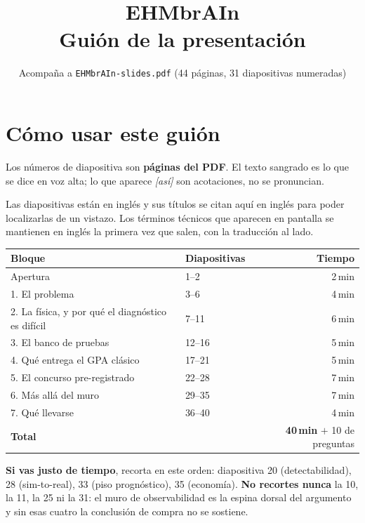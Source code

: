 \documentclass[11pt,a4paper]{article}
\title{\vspace{-1.5cm}\textbf{EHMbrAIn}\\[2mm]
  \large Guión de la presentación}
\author{}
\date{\small Acompaña a \texttt{EHMbrAIn-slides.pdf} (44 páginas, 31 diapositivas numeradas)}
\newcommand{\escena}[1]{{\itshape\color{grayc}[#1]}}
\begin{document}
\maketitle
\thispagestyle{fancy}
\vspace{-1.2cm}

\section*{Cómo usar este guión}

Los números de diapositiva son \textbf{páginas del PDF}. El texto sangrado es lo
que se dice en voz alta; lo que aparece \escena{así} son acotaciones, no se
pronuncian.

Las diapositivas están en inglés y sus títulos se citan aquí en inglés para poder
localizarlas de un vistazo. Los términos técnicos que aparecen en pantalla se
mantienen en inglés la primera vez que salen, con la traducción al lado.

\begin{center}\small
\begin{tabular}{@{}llr@{}}
  \toprule
  Bloque & Diapositivas & Tiempo \\
  \midrule
  Apertura & 1--2 & 2\,min \\
  1. El problema & 3--6 & 4\,min \\
  2. La física, y por qué el diagnóstico es difícil & 7--11 & 6\,min \\
  3. El banco de pruebas & 12--16 & 5\,min \\
  4. Qué entrega el GPA clásico & 17--21 & 5\,min \\
  5. El concurso pre-registrado & 22--28 & 7\,min \\
  6. Más allá del muro & 29--35 & 7\,min \\
  7. Qué llevarse & 36--40 & 4\,min \\
  \midrule
  \textbf{Total} & & \textbf{40\,min} $+$ 10 de preguntas \\
  \bottomrule
\end{tabular}
\end{center}

\textbf{Si vas justo de tiempo}, recorta en este orden: diapositiva 20
(detectabilidad), 28 (sim-to-real), 33 (piso prognóstico), 35 (economía).
\textbf{No recortes nunca} la 10, la 11, la 25 ni la 31: el muro de
observabilidad es la espina dorsal del argumento y sin esas cuatro la conclusión
de compra no se sostiene.

\end{document}
